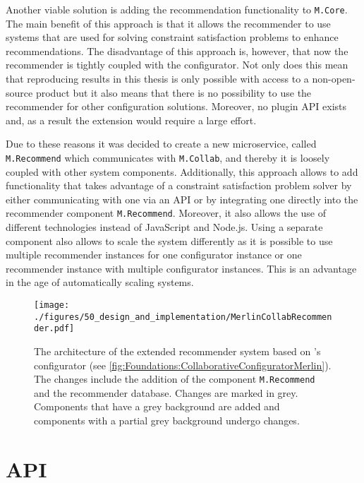 Another viable solution is adding the recommendation functionality to \texttt{M.Core}. The main benefit of this approach is that it allows the recommender to use systems that are used for solving constraint satisfaction problems to enhance recommendations. The disadvantage of this approach is, however, that now the recommender is tightly coupled with the configurator. Not only does this mean that reproducing results in this thesis is only possible with access to a non-open-source product but it also means that there is no possibility to use the recommender for other configuration solutions. Moreover, no plugin API exists and, as a result the extension would require a large effort.

Due to these reasons it was decided to create a new microservice, called \texttt{M.Recommend} which communicates with \texttt{M.Collab}, and thereby it is loosely coupled with other system components. Additionally, this approach allows to add functionality that takes  advantage of a constraint satisfaction problem solver by either communicating with one via an API or by integrating one directly into the recommender component \texttt{M.Recommend}. Moreover, it also allows the use of different technologies instead of JavaScript and Node.js. Using a separate component also allows to scale the system differently as it is possible to use multiple recommender instances for one configurator instance or one recommender instance with multiple configurator instances. This is an advantage in the age of automatically scaling systems.

\begin{figure}
    \centering
    \texttt{[image: ./figures/50\_design\_and\_implementation/MerlinCollabRecommender.pdf]}
    \caption[Architecture: Recommender System and Configurator]{The architecture of the extended recommender system based on \citeauthor{raabKollaborativeProduktkonfigurationEchtzeit2019}'s configurator (see \autoref{fig:Foundations:CollaborativeConfiguratorMerlin}). The changes include the addition of the component \texttt{M.Recommend} and the recommender database. Changes are marked in grey. Components that have a grey background are added and components with a partial grey background undergo changes.}
    \label{fig:DesignImplementation:RecommenderForCollaborativeConfiguratorMerlin}
\end{figure}

\section{API}
\label{sec:DesignImplementation:API}

